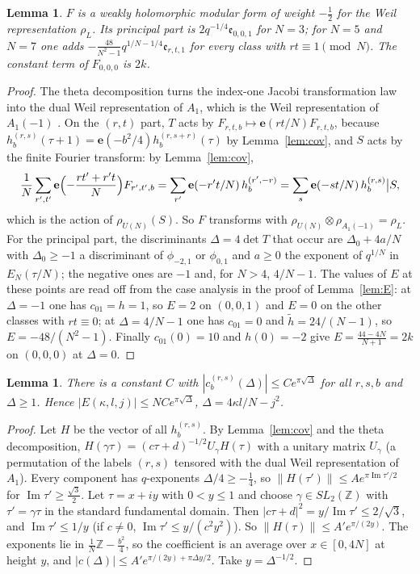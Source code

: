 \documentclass[11pt]{amsart}
\numberwithin{equation}{section}
\theoremstyle{plain}
\newtheorem{lem}[thm]{Lemma}
\theoremstyle{definition}
\theoremstyle{remark}
\newcommand{\Z}{\mathbb{Z}}
\newcommand{\e}{\mathbf{e}}
\newcommand{\pmi}{\phi_{-2,1}}
\newcommand{\pz}{\phi_{0,1}}
\begin{document}
\begin{lem}\label{lem:input}
$F$ is a weakly holomorphic modular form of weight $-\frac12$ for the Weil representation $\rho_L$. Its principal part is $2q^{-1/4}\mathfrak e_{0,0,1}$ for $N=3$; for $N=5$ and $N=7$ one adds $-\frac{48}{N^2-1}q^{1/N-1/4}\mathfrak e_{r,t,1}$ for every class with $rt\equiv1\pmod N$. The constant term of $F_{0,0,0}$ is $2k$.
\end{lem}

\begin{proof}
The theta decomposition turns the index-one Jacobi transformation law into the dual Weil representation of $A_1$, which is the Weil representation of $A_1(-1)$ \cite[Theorem~5.1]{EZ85}. On the $(r,t)$ part, $T$ acts by $F_{r,t,b}\mapsto\e(rt/N)F_{r,t,b}$, because $h^{(r,s)}_b(\tau+1)=\e(-b^2/4)h^{(r,s+r)}_b(\tau)$ by Lemma~\ref{lem:cov}, and $S$ acts by the finite Fourier transform: by Lemma~\ref{lem:cov},
\[
\frac1N\sum_{r',t'}\e\Bigl(-\frac{rt'+r't}{N}\Bigr)F_{r',t',b}=\sum_{r'}\e(-r't/N)\,h^{(r',-r)}_b=\sum_{s}\e(-st/N)\,h^{(r,s)}_b\big|S ,
\]
which is the action of $\rho_{U(N)}(S)$. So $F$ transforms with $\rho_{U(N)}\otimes\rho_{A_1(-1)}=\rho_L$. For the principal part, the discriminants $\Delta=4\det T$ that occur are $\Delta_0+4a/N$ with $\Delta_0\ge-1$ a discriminant of $\pmi$ or $\pz$ and $a\ge0$ the exponent of $q^{1/N}$ in $E_N(\tau/N)$; the negative ones are $-1$ and, for $N>4$, $4/N-1$. The values of $E$ at these points are read off from the case analysis in the proof of Lemma~\ref{lem:E}: at $\Delta=-1$ one has $c_{01}=h=1$, so $E=2$ on $(0,0,1)$ and $E=0$ on the other classes with $rt\equiv0$; at $\Delta=4/N-1$ one has $c_{01}=0$ and $\tilde h=24/(N-1)$, so $E=-48/(N^2-1)$. Finally $c_{01}(0)=10$ and $h(0)=-2$ give $E=\frac{44-4N}{N+1}=2k$ on $(0,0,0)$ at $\Delta=0$.
\end{proof}


\begin{lem}\label{lem:growth}
There is a constant $C$ with $|c^{(r,s)}_b(\Delta)|\le Ce^{\pi\sqrt\Delta}$ for all $r,s,b$ and $\Delta\ge1$. Hence $|E(\kappa,l,j)|\le NCe^{\pi\sqrt\Delta}$, $\Delta=4\kappa l/N-j^2$.
\end{lem}

\begin{proof}
Let $H$ be the vector of all $h^{(r,s)}_b$. By Lemma~\ref{lem:cov} and the theta decomposition, $H(\gamma\tau)=(c\tau+d)^{-1/2}U_\gamma H(\tau)$ with a unitary matrix $U_\gamma$ (a permutation of the labels $(r,s)$ tensored with the dual Weil representation of $A_1$). Every component has $q$-exponents $\Delta/4\ge-\frac14$, so $\|H(\tau')\|\le Ae^{\pi\operatorname{Im}\tau'/2}$ for $\operatorname{Im}\tau'\ge\frac{\sqrt3}2$. Let $\tau=x+iy$ with $0<y\le1$ and choose $\gamma\in SL_2(\Z)$ with $\tau'=\gamma\tau$ in the standard fundamental domain. Then $|c\tau+d|^2=y/\operatorname{Im}\tau'\le 2/\sqrt3$, and $\operatorname{Im}\tau'\le1/y$ (if $c\ne0$, $\operatorname{Im}\tau'\le y/(c^2y^2)$). So $\|H(\tau)\|\le A'e^{\pi/(2y)}$. The exponents lie in $\frac1N\Z-\frac{b^2}4$, so the coefficient is an average over $x\in[0,4N]$ at height $y$, and $|c(\Delta)|\le A'e^{\pi/(2y)+\pi\Delta y/2}$. Take $y=\Delta^{-1/2}$.
\end{proof}
\end{document}
